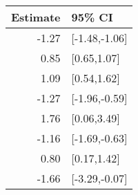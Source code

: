 \begin{tabular}{rl}
  \hline
Estimate & 95\% CI \\ 
  \hline
-1.27 & [-1.48,-1.06] \\ 
  0.85 & [0.65,1.07] \\ 
  1.09 & [0.54,1.62] \\ 
  -1.27 & [-1.96,-0.59] \\ 
  1.76 & [0.06,3.49] \\ 
  -1.16 & [-1.69,-0.63] \\ 
  0.80 & [0.17,1.42] \\ 
  -1.66 & [-3.29,-0.07] \\ 
   \hline
\end{tabular}


